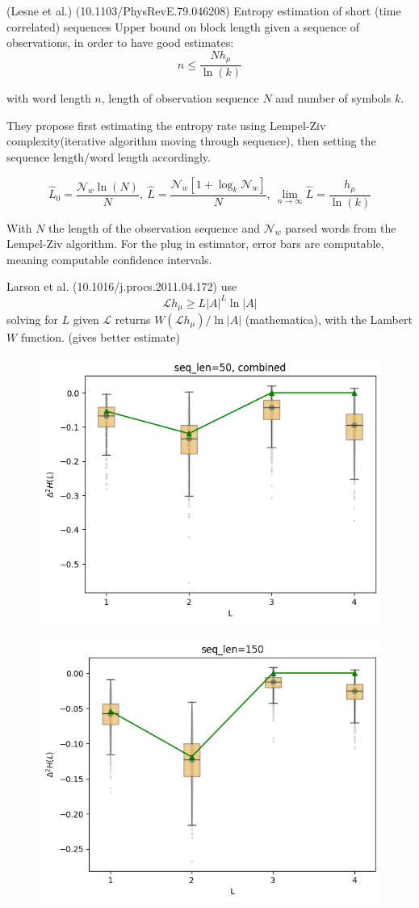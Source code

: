 \documentclass[12pt,a4paper]{article}
\begin{document}
(Lesne et al.) (10.1103/PhysRevE.79.046208) Entropy estimation of short (time correlated) sequences
Upper bound on block length given a sequence of observations, in order to have good estimates:
$$ n \leq \frac{N h_\mu}{\ln(k)} $$

with word length $n$, length of observation sequence $N$ and number of symbols $k$.

They propose first estimating the entropy rate using Lempel-Ziv complexity(iterative algorithm moving through sequence), then setting the sequence length/word length accordingly.

$$ \hat{L}_0 = \frac{\mathcal{N}_w \ln(N)}{N},\ \hat{L}=\frac{\mathcal{N}_w[1+\log_k\mathcal{N}_w]}{N},\ \lim_{n \to \infty}\hat{L} = \frac{h_\mu}{\ln(k)} $$

With $N$ the length of the observation sequence and $\mathcal{N}_w$ parsed words from the Lempel-Ziv algorithm.
For the plug in estimator, error bars are computable, meaning computable confidence intervals.

Larson et al. (10.1016/j.procs.2011.04.172) use
$$ \mathcal{L} h_\mu \geq L|A|^L \ln|A| $$
solving for $L$ given $\mathcal{L}$ returns $W(\mathcal{L} h_\mu) / \ln|A|$ (mathematica), with the Lambert $W$ function.
(gives better estimate)

\begin{figure}
    \centering
    \includegraphics[width=0.5\linewidth]{../figures/predictability_gain_estimation.png}
\end{figure}

\begin{figure}
    \centering
    \includegraphics[width=0.5\linewidth]{../figures/predictability_gain_estimation_optimal.png}
\end{figure}
\end{document}

